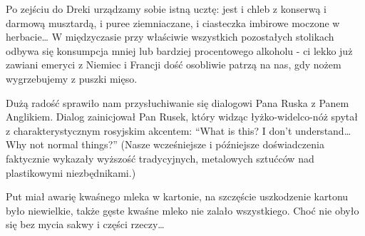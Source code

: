 
Po zejściu do Dreki urządzamy sobie istną ucztę: jest i chleb z konserwą i darmową musztardą, i puree ziemniaczane, i ciasteczka imbirowe moczone w herbacie… W międzyczasie przy właściwie wszystkich pozostałych stolikach odbywa się konsumpcja mniej lub bardziej procentowego alkoholu - ci lekko już zawiani emeryci z Niemiec i Francji dość osobliwie patrzą na nas, gdy nożem wygrzebujemy z puszki mięso.

Dużą radość sprawiło nam przysłuchiwanie się dialogowi Pana Ruska z Panem Anglikiem. Dialog zainicjował Pan Rusek, który widząc łyżko-widelco-nóż spytał z charakterystycznym rosyjskim akcentem: “What is this? I don’t understand… Why not normal things?” (Nasze wcześniejsze i późniejsze doświadczenia faktycznie wykazały wyższość tradycyjnych, metalowych sztućców nad plastikowymi niezbędnikami.)

Put miał awarię kwaśnego mleka w kartonie, na szczęście uszkodzenie kartonu było niewielkie, także gęste kwaśne mleko nie zalało wszystkiego. Choć nie obyło się bez mycia sakwy i części rzeczy…


